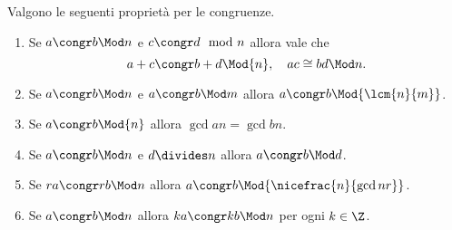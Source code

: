 \begin{proposition}\label{prop:caratt_congr}
    Valgono le seguenti proprietà per le congruenze.
    \begin{enumerate}[label={(\arabic*)}]
        \item Se $a \congr b \Mod n$ e $c \congr d \mod n$ allora vale che \[
            a+c \congr b + d \Mod{n}, \quad ac \cong bd \Mod n.   
        \]
        \item Se $a \congr b \Mod n$ e $a \congr b \Mod m$ allora $a \congr b \Mod{\lcm{n}{m}}$.
        \item Se $a \congr b \Mod{n}$ allora $\gcd{a}{n} = \gcd{b}{n}$.
        \item Se $a \congr b \Mod n$ e $d \divides n$ allora $a \congr b \Mod d$.
        \item Se $ra \congr rb \Mod n$ allora $a \congr b \Mod{\nicefrac{n}{\gcd{n}{r}}}$.
        \item Se $a \congr b \Mod n$ allora $ka \congr kb \Mod n$ per ogni $k \in \Z$.
    \end{enumerate}
\end{proposition}
